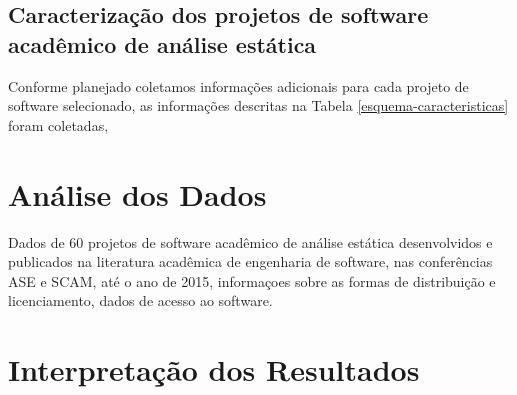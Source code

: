 
\subsection{Caracterização dos projetos de software acadêmico de análise estática} %

Conforme planejado coletamos informações adicionais para cada projeto de
software selecionado, as informações descritas na Tabela
\ref{esquema-caracteristicas} foram coletadas,





\section{Análise dos Dados} \label{estudo1:analise}

Dados de 60 projetos de software acadêmico de análise estática desenvolvidos e
publicados na literatura acadêmica de engenharia de software, nas conferências
ASE e SCAM, até o ano de 2015, informaçoes sobre as formas de distribuição e
licenciamento, dados de acesso ao software.



\section{Interpretação dos Resultados} \label{estudo1:interpretacao}

